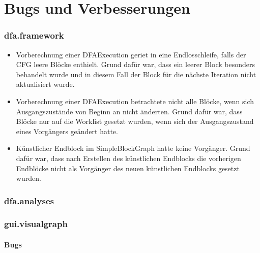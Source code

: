 \part{Bugs und Verbesserungen}

\section{dfa.framework}

\begin{itemize}
	\item Vorberechnung einer DFAExecution geriet in eine Endlosschleife, falls der CFG leere Blöcke enthielt.
	Grund dafür war, dass ein leerer Block besonders behandelt wurde und in diesem Fall der Block für die nächste Iteration nicht aktualisiert wurde.
	\item Vorberechnung einer DFAExecution betrachtete nicht alle Blöcke, wenn sich Ausgangszustände von Beginn an nicht änderten. Grund dafür war, dass Blöcke nur auf die Worklist gesetzt wurden, wenn sich der Ausgangszustand eines Vorgängers geändert hatte. 
	\item Künstlicher Endblock im SimpleBlockGraph hatte keine Vorgänger. Grund dafür war, dass nach Erstellen des künstlichen Endblocks die vorherigen Endblöcke nicht als Vorgänger des neuen künstlichen Endblocks gesetzt wurden.
\end{itemize}

\section{dfa.analyses}

\section{gui.visualgraph}

\subsection{Bugs}

